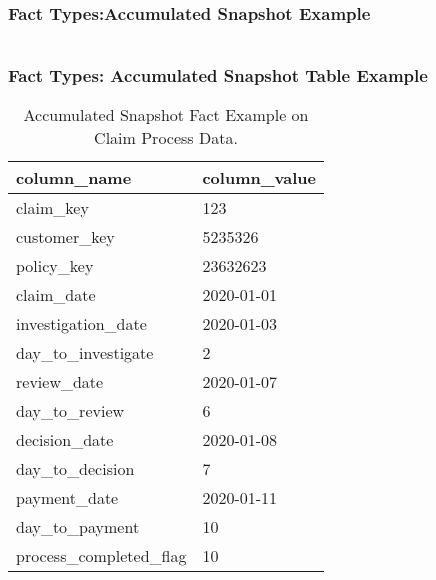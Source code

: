 \begin{frame}
    \frametitle{Fact Types:Accumulated Snapshot Example}
    \setlength{\leftmargini}{2em}    
    \setlength{\headsep}{2em}
    \begin{columns}[T,onlytextwidth]                       
                    \setlength{\headsep}{2em}
                \setlength{\partopsep}{1pt}
                
                    \setlength{\headsep}{2em}
                \setlength{\partopsep}{1pt}
                
   \end{columns}    
\end{frame}
\begin{frame}
    \frametitle{Fact Types: Accumulated Snapshot Table Example}
    
    \begin{table}
    		\begin{tabular}{| l | l |}
           			\hline
                      column\_name & column\_value\\
                  	  \hline
                      \hline
                      claim\_key & 123\\
                      customer\_key& 5235326\\
                      policy\_key& 23632623\\
                      claim\_date& 2020-01-01\\
                      investigation\_date& 2020-01-03\\
                      day\_to\_investigate& 2\\
                      review\_date& 2020-01-07\\
                      day\_to\_review& 6\\
                      decision\_date& 2020-01-08\\
                      day\_to\_decision& 7\\
                      payment\_date& 2020-01-11\\
                      day\_to\_payment& 10\\
                      process\_completed\_flag& 10\\                      
    			\hline
    		\end{tabular}
    	\caption{Accumulated Snapshot Fact Example on Claim Process Data.}
    \end{table}
    
\end{frame}

